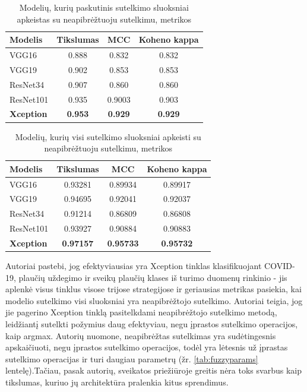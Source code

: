 \documentclass[fleqn]{VUMIFKompMagistrinis}
\begin{document}
\begin{table}[H]\footnotesize
  \centering
\caption{Modelių, kurių paskutinis sutelkimo sluoksniai apkeistas su neapibrėžtuoju sutelkimu, metrikos \cite{HASAN2023}}
\begin{tabular}{|l|c|c|c|}
\hline
Modelis      & Tikslumas & MCC   & Koheno kappa \\ \hline
VGG16      & 0.888  & 0.832 &  0.832            \\
VGG19      & 0.902  & 0.853 &  0.853            \\
ResNet34   & 0.907  & 0.860 & 0.860           \\
ResNet101  & 0.935  & 0.9003 & 0.903            \\
\textbf{Xception}   & \textbf{0.953}  & \textbf{0.929} & \textbf{0.929}           \\ \hline
  \end{tabular}
  \label{tab:fuzzyiverciai2}
\end{table}

\begin{table}[H]\footnotesize
  \centering
\caption{Modelių, kurių visi sutelkimo sluoksniai apkeisti su neapibrėžtuoju sutelkimu, metrikos \cite{HASAN2023}}
\begin{tabular}{|l|c|c|c|}
\hline
Modelis      & Tikslumas & MCC   & Koheno kappa \\ \hline
VGG16      & 0.93281  & 0.89934 &  0.89917            \\
VGG19      & 0.94695  & 0.92041 &  0.92037            \\
ResNet34   & 0.91214  & 0.86809 & 0.86808            \\
ResNet101  & 0.93927  & 0.90884 & 0.90883            \\
\textbf{Xception}   & \textbf{0.97157}  & \textbf{0.95733} & \textbf{0.95732}           \\ \hline
  \end{tabular}
  \label{tab:fuzzyiverciai3}
\end{table}
\par
Autoriai pastebi, jog efektyviausias yra Xception tinklas klasifikuojant COVID-19, plaučių uždegimo ir sveikų plaučių klases iš turimo duomenų rinkinio - jis aplenkė visus tinklus visose trijose strategijose ir geriausias metrikas pasiekia, kai modelio sutelkimo visi sluoksniai yra neapibrėžtojo sutelkimo. Autoriai teigia, jog jie pagerino Xception tinklą pasitelkdami neapibrėžtojo sutelkimo metodą, leidžiantį sutelkti požymius daug efektyviau, negu įprastos sutelkimo operacijos, kaip argmax. Autorių nuomone, neapibrėžtas sutelkimas yra sudėtingesnis apskaičiuoti, negu įprastos sutelkimo operacijos, todėl yra lėtesnis už įprastas sutelkimo operacijas ir turi daugiau parametrų (žr. \ref{tab:fuzzyparams} lentelę).Tačiau, pasak autorių, sveikatos priežiūroje greitis nėra toks svarbus kaip tikslumas, kuriuo jų architektūra pralenkia kitus sprendimus. \cite{HASAN2023}
\end{document}
